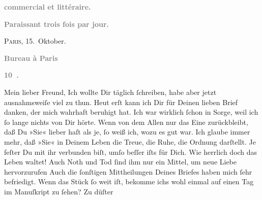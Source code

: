 \begin{ledgroupsized}[t]{13cm}
           \pstart
           \begin{otherlanguage}{french}\textcolor{gray}{\textbf{commercial et littéraire.}}\end{otherlanguage}\pend
           \pstart
           \begin{otherlanguage}{french}\textcolor{gray}{\textbf{\textbf{Paraissant trois fois par jour.}}}\end{otherlanguage}\hfill \textsc{Paris}, 15. Oktober.\pend
           \pstart
           \begin{otherlanguage}{french}\textcolor{gray}{\textbf{\textbf{Bureau à Paris}}}\end{otherlanguage}\pend
           \pstart
           \begin{otherlanguage}{french}\textcolor{gray}{\textbf{\textbf{10 .}}}\end{otherlanguage}\pend
           \pstart\center{}Mein lieber Freund,\pend\pstart
           Ich wollte Dir täglich ſchreiben, habe aber jetzt ausnahmsweiſe viel zu thun. Heut erſt kann ich Dir für Deinen lieben Brief danken,
               der mich wahrhaft beruhigt hat. Ich war wirklich ſchon in Sorge, weil ich ſo lange
               nichts \introOben{}von Dir\introOben{} hörte.\pend
           \pstart
           Wenn von dem Allen nur das Eine zurückbleibt, daß Du »Sie« lieber haſt als je, ſo weiß ich, wozu
               es gut war. Ich glaube immer mehr, daß »Sie« in Deinem Leben die Treue, die Ruhe, die Ordnung
               darſtellt. Je feſter Du mit ihr verbunden biſt, umſo beſſer iſts für Dich. Wie
               herrlich doch {\pb}das Leben waltet! Auch Noth und Tod
               ſind ihm nur ein Mittel, um neue Liebe hervorzurufen{\dotsfive}\pend
           \pstart
           Auch die ſonſtigen Mittheilungen Deines Briefes haben mich ſehr befriedigt. Wenn das
                  Stück ſo weit
               iſt, bekomme ichs wohl einmal auf einen Tag im Manuſkript zu ſehen? Zu düſter

\end{ledgroupsized}
